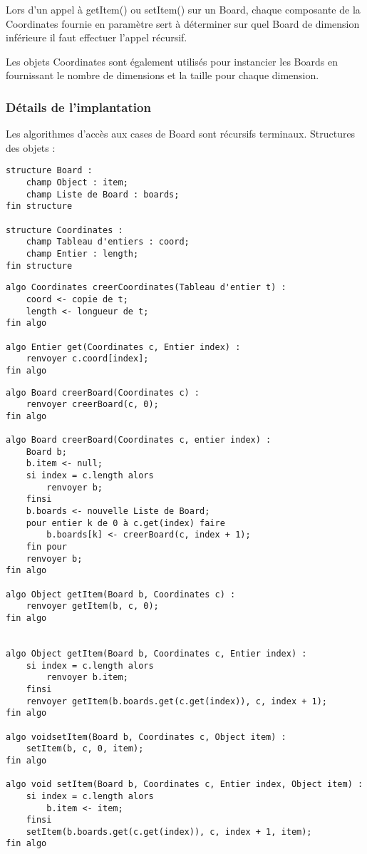 	Lors d'un appel à getItem() ou setItem() sur un Board, chaque composante de la Coordinates fournie en paramètre sert à déterminer sur quel Board de dimension inférieure il faut effectuer l'appel récursif. \newline

	Les objets Coordinates sont également utilisés pour instancier les Boards en fournissant le nombre de dimensions et la taille pour chaque dimension.

	\subsubsection{Détails de l'implantation}

	Les algorithmes d'accès aux cases de Board sont récursifs terminaux. \newline
	Structures des objets :

	\begin{verbatim}
structure Board :
    champ Object : item;
    champ Liste de Board : boards;
fin structure
		
structure Coordinates :
    champ Tableau d'entiers : coord;
    champ Entier : length;
fin structure
	\end{verbatim}


	
		\begin{verbatim}
algo Coordinates creerCoordinates(Tableau d'entier t) :
    coord <- copie de t;
	length <- longueur de t;
fin algo
			
algo Entier get(Coordinates c, Entier index) :
    renvoyer c.coord[index];
fin algo
		\end{verbatim}
		


	\begin{verbatim}
algo Board creerBoard(Coordinates c) :
    renvoyer creerBoard(c, 0);
fin algo
		
algo Board creerBoard(Coordinates c, entier index) :
    Board b;
    b.item <- null;
    si index = c.length alors
        renvoyer b;
    finsi
    b.boards <- nouvelle Liste de Board;
    pour entier k de 0 à c.get(index) faire
        b.boards[k] <- creerBoard(c, index + 1);
    fin pour
    renvoyer b;
fin algo
		
algo Object getItem(Board b, Coordinates c) :
    renvoyer getItem(b, c, 0);
fin algo
		
		
algo Object getItem(Board b, Coordinates c, Entier index) :
    si index = c.length alors
        renvoyer b.item;
    finsi
    renvoyer getItem(b.boards.get(c.get(index)), c, index + 1);
fin algo
		
algo voidsetItem(Board b, Coordinates c, Object item) :
    setItem(b, c, 0, item);
fin algo
		
algo void setItem(Board b, Coordinates c, Entier index, Object item) :
    si index = c.length alors
        b.item <- item;
    finsi
    setItem(b.boards.get(c.get(index)), c, index + 1, item);
fin algo
	\end{verbatim}

